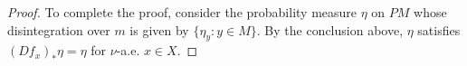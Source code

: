 \documentclass[a4paper,12pt,reqno]{amsart}
\numberwithin{equation}{section}
\newtheorem{lemma}[theorem]{Lemma}
\newcommand{\cal}{\mathcal}
\newcommand{\XX}{{\cal X}}
\newcommand{\YY}{{\cal Y}}
\newcommand{\Pp}{{\mathbb{P}}}
\begin{document}
\begin{proof}
To complete the proof, consider the probability measure $\eta$ on $PM$ whose disintegration over $m$ is given by $\{\eta_y : y \in M\}$. By the conclusion above, $\eta$ satisfies $(Df_x)_* \eta = \eta$ for $\nu$-a.e. $x \in X$.
%
%
\end{proof}

%

\end{document}
